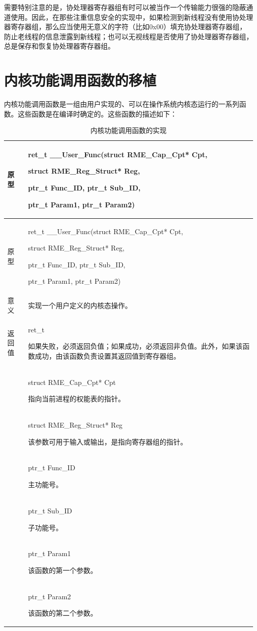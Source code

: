 需要特别注意的是，协处理器寄存器组有时可以被当作一个传输能力很强的隐蔽通道使用。因此，在那些注重信息安全的实现中，如果检测到新线程没有使用协处理器寄存器组，那么应当使用无意义的字符（比如0x00）填充协处理器寄存器组，防止老线程的信息泄露到新线程；也可以无视线程是否使用了协处理器寄存器组，总是保存和恢复协处理器寄存器组。

\section{内核功能调用函数的移植}\label{sec:7-kernel-function-call-function-porting}

内核功能调用函数是一组由用户实现的、可以在操作系统内核态运行的一系列函数。这些函数是在编译时确定的。这些函数的描述如下：

\begin{xltabular}{\textwidth}{@{}>{\hsize\raggedright\arraybackslash}X>{\hsize\raggedright\arraybackslash}X@{}}
\caption{内核功能调用函数的实现}\label{tab:7-73-kernel-function-call-function-implementation}\\
\toprule
原型\strut
 & ret\_t \_\_User\_Func(struct RME\_Cap\_Cpt* Cpt,

struct RME\_Reg\_Struct* Reg,

ptr\_t Func\_ID, ptr\_t Sub\_ID,

ptr\_t Param1, ptr\_t Param2)\strut
\tabularnewline
\endfirsthead
\toprule
原型\strut
 & ret\_t \_\_User\_Func(struct RME\_Cap\_Cpt* Cpt,

struct RME\_Reg\_Struct* Reg,

ptr\_t Func\_ID, ptr\_t Sub\_ID,

ptr\_t Param1, ptr\_t Param2)\strut
\tabularnewline
\midrule
\endhead
\bottomrule
\endlastfoot
意义 & 实现一个用户定义的内核态操作。\tabularnewline
返回值\strut
 & ret\_t

如果失败，必须返回负值；如果成功，必须返回非负值。此外，如果该函数成功，由该函数负责设置其返回值到寄存器组。\strut
\tabularnewline
{} & struct RME\_Cap\_Cpt* Cpt

指向当前进程的权能表的指针。\strut
\tabularnewline
\strut
 & struct RME\_Reg\_Struct* Reg

该参数可用于输入或输出，是指向寄存器组的指针。\strut
\tabularnewline
\strut
 & ptr\_t Func\_ID

主功能号。\strut
\tabularnewline
\strut
 & ptr\_t Sub\_ID

子功能号。\strut
\tabularnewline
\strut
 & ptr\_t Param1

该函数的第一个参数。\strut
\tabularnewline
\strut
 & ptr\_t Param2

该函数的第二个参数。\strut
\tabularnewline
\end{xltabular}

